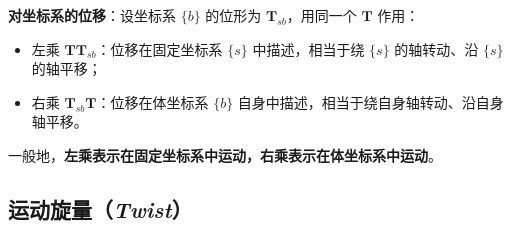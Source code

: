 \textbf{对坐标系的位移}：设坐标系 $\{b\}$ 的位形为 $\boldsymbol{T}_{sb}$，用同一个 $\boldsymbol{T}$ 作用：
\begin{itemize}
	\item 左乘 $\boldsymbol{T}\boldsymbol{T}_{sb}$：位移在固定坐标系 $\{s\}$ 中描述，相当于绕 $\{s\}$ 的轴转动、沿 $\{s\}$ 的轴平移；
	\item 右乘 $\boldsymbol{T}_{sb}\boldsymbol{T}$：位移在体坐标系 $\{b\}$ 自身中描述，相当于绕自身轴转动、沿自身轴平移。
\end{itemize}
一般地，\textbf{左乘表示在固定坐标系中运动，右乘表示在体坐标系中运动}。

\subsection{运动旋量（\textit{Twist}）}

